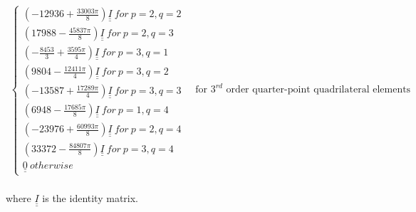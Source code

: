 \documentclass[review]{elsarticle}
\begin{document}
\begin{equation}
\begin{split}
\begin{cases}
\left(-12936+\frac{33003\pi}{8}\right)\underline{\underline{I}}\ for\ p=2,q=2\\
\left(17988-\frac{45837\pi}{8}\right)\underline{\underline{I}}\ for\ p=2,q=3\\
\left(-\frac{8453}{3}+\frac{3595\pi}{4}\right)\underline{\underline{I}}\ for\ p=3,q=1\\
\left(9804-\frac{12411\pi}{4}\right)\underline{\underline{I}}\ for\ p=3,q=2\\
\left(-13587+\frac{17289\pi}{4}\right)\underline{\underline{I}}\ for\ p=3,q=3\\
\left(6948-\frac{17685\pi}{8}\right)\underline{\underline{I}}\ for\ p=1,q=4\\
\left(-23976+\frac{60993\pi}{8}\right)\underline{\underline{I}}\ for\ p=2,q=4\\
\left(33372-\frac{84807\pi}{8}\right)\underline{\underline{I}}\ for\ p=3,q=4\\
\underline{\underline{0}}\ otherwise
\end{cases}\quad \text{for $3^{rd}$ order quarter-point quadrilateral elements}\\
\end{split}
\end{equation}

where $\underline{\underline{I}}$ is the identity matrix.
\end{document}
